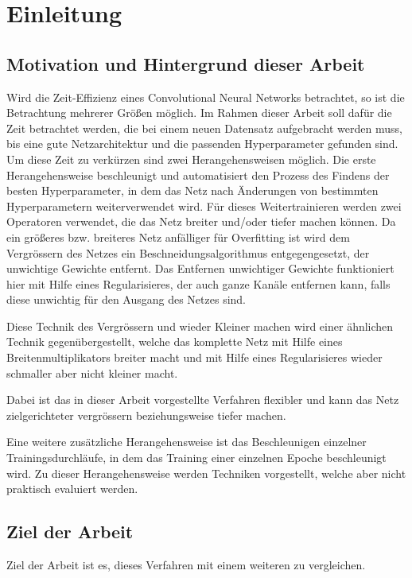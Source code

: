 \chapter{Einleitung}
\label{sec:EinleitungGesamt}

\section{Motivation und Hintergrund dieser Arbeit}
Wird die Zeit-Effizienz eines Convolutional Neural Networks betrachtet, so ist die Betrachtung mehrerer Größen möglich. Im Rahmen dieser Arbeit soll dafür die Zeit betrachtet werden, die bei einem neuen Datensatz aufgebracht werden muss, bis eine gute Netzarchitektur und die passenden Hyperparameter gefunden sind. Um diese Zeit zu verkürzen sind zwei Herangehensweisen möglich. Die erste Herangehensweise beschleunigt und automatisiert den Prozess des Findens der besten Hyperparameter, in dem das Netz nach Änderungen von bestimmten Hyperparametern weiterverwendet wird. Für dieses Weitertrainieren werden zwei Operatoren verwendet, die das Netz breiter und/oder tiefer machen können. Da ein größeres bzw. breiteres Netz anfälliger für Overfitting ist wird dem Vergrössern des Netzes ein Beschneidungsalgorithmus entgegengesetzt, der unwichtige Gewichte entfernt. Das Entfernen unwichtiger Gewichte funktioniert hier mit Hilfe eines Regularisieres, der auch ganze Kanäle entfernen kann, falls diese unwichtig für den Ausgang des Netzes sind. 


Diese Technik des Vergrössern und wieder Kleiner machen wird einer ähnlichen Technik gegenübergestellt, welche das komplette Netz mit Hilfe eines Breitenmultiplikators breiter macht und mit Hilfe eines Regularisieres wieder schmaller aber nicht kleiner macht.

Dabei ist das in dieser Arbeit vorgestellte Verfahren flexibler und kann das Netz zielgerichteter vergrössern beziehungsweise tiefer machen.

Eine weitere zusätzliche Herangehensweise ist das Beschleunigen einzelner Trainingsdurchläufe, in dem das Training einer einzelnen Epoche beschleunigt wird. Zu dieser Herangehensweise werden Techniken vorgestellt, welche aber nicht praktisch evaluiert werden. 

\section{Ziel der Arbeit}
Ziel der Arbeit ist es, dieses Verfahren mit einem weiteren zu vergleichen.


